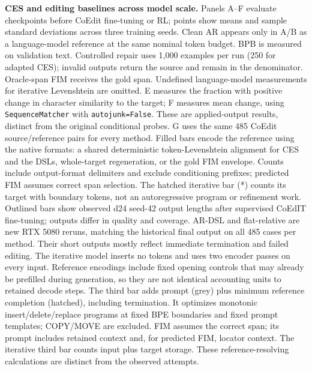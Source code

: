 \textbf{CES and editing baselines across model scale.}
Panels A--F evaluate checkpoints before CoEdit fine-tuning or RL; points show means and sample standard deviations across three training seeds.
Clean AR appears only in A/B as a language-model reference at the same nominal token budget. BPB is measured on validation text.
Controlled repair uses 1,000 examples per run (250 for adapted CES); invalid outputs return the source and remain in the denominator.
Oracle-span FIM receives the gold span. Undefined language-model measurements for iterative Levenshtein are omitted.
E measures the fraction with positive change in character similarity to the target; F measures mean change, using \texttt{SequenceMatcher} with \texttt{autojunk=False}.
These are applied-output results, distinct from the original conditional probes. G uses the same 485 CoEdit source/reference pairs for every method.
Filled bars encode the reference using the native formats: a shared deterministic token-Levenshtein alignment for CES and the DSLs, whole-target regeneration, or the gold FIM envelope.
Counts include output-format delimiters and exclude conditioning prefixes; predicted FIM assumes correct span selection.
The hatched iterative bar (*) counts its target with boundary tokens, not an autoregressive program or refinement work.
Outlined bars show observed d24 seed-42 output lengths after supervised CoEdIT fine-tuning; outputs differ in quality and coverage. AR-DSL and flat-relative are new RTX 5080 reruns, matching the historical final output on all 485 cases per method.
Their short outputs mostly reflect immediate termination and failed editing. The iterative model inserts no tokens and uses two encoder passes on every input. Reference encodings include fixed opening controls that may already be prefilled during generation, so they are not identical accounting units to retained decode steps. The third bar adds prompt (grey) plus minimum reference completion (hatched), including termination. It optimizes monotonic insert/delete/replace programs at fixed BPE boundaries and fixed prompt templates; COPY/MOVE are excluded. FIM assumes the correct span; its prompt includes retained context and, for predicted FIM, locator context. The iterative third bar counts input plus target storage. These reference-resolving calculations are distinct from the observed attempts.
